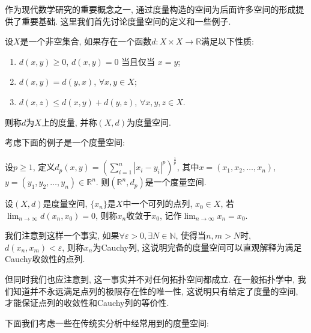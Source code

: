 \documentclass[theorem=false,mathfont=none,openany,sub3section]{easybook}
\begin{document}
作为现代数学研究的重要概念之一, 通过度量构造的空间为后面许多空间的形成提供了重要基础. 这里我们首先讨论度量空间的定义和一些例子.\par

\begin{definition}
  设$X$是一个非空集合, 如果存在一个函数$d: X \times X \to \mathbb{R}$满足以下性质:\par
  \begin{enumerate}
    \item $d(x, y) \geq 0$, $d(x, y) = 0$ 当且仅当 $x = y$;
    \item $d(x, y) = d(y, x)$, $\forall x, y \in X$;
    \item $d(x, z) \leq d(x, y) + d(y, z)$, $\forall x, y, z \in X$.
  \end{enumerate}
  则称$d$为$X$上的度量, 并称$(X, d)$为度量空间.\par
\end{definition}

考虑下面的例子是一个度量空间:\par

\begin{example}
  设$p\geqslant 1$, 定义$d_p(x,y) = \left( \sum_{i=1}^{n} |x_i - y_i|^p \right)^{\frac{1}{p}}$, 其中$x = (x_1, x_2, \ldots, x_n)$, $y = (y_1, y_2, \ldots, y_n) \in \mathbb{R}^n$. 则$(\mathbb{R}^n, d_p)$是一个度量空间.\par
\end{example}

\begin{definition}
  设$(X,d)$是度量空间, $\{x_n\}$是$X$中一个可列的点列, $x_0 \in X$, 若$\lim_{n \to \infty} d(x_n, x_0) = 0$, 则称$x_n$收敛于$x_0$, 记作$\lim_{n \to \infty}x_n = x_0$.\par
\end{definition}

\begin{remark}
  我们注意到这样一个事实, 如果$\forall \varepsilon >0, \exists N \in \mathbb{N}$, 使得当$n,m  > N$时, $d(x_n, x_m) < \varepsilon$, 则称$x_n$为Cauchy列, 这说明完备的度量空间可以直观解释为满足Cauchy收敛性的点列.\par
  但同时我们也应注意到, 这一事实并不对任何拓扑空间都成立. 在一般拓扑学中, 我们知道并不永远满足点列的极限存在性的唯一性, 这说明只有给定了度量的空间, 才能保证点列的收敛性和Cauchy列的等价性.\par
\end{remark}

下面我们考虑一些在传统实分析中经常用到的度量空间:\par
\end{document}
